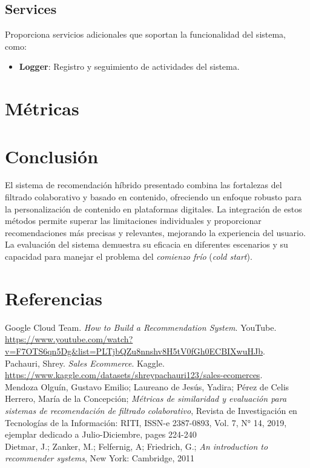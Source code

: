 \documentclass{llncs}
\begin{document}
\subsection{Services}
Proporciona servicios adicionales que soportan la funcionalidad del sistema, como:

\begin{itemize}
    \item \textbf{Logger}: Registro y seguimiento de actividades del sistema.
\end{itemize}

\section{Métricas}

\section{Conclusión}
El sistema de recomendación híbrido presentado combina las fortalezas del filtrado colaborativo y basado en contenido, ofreciendo un enfoque robusto para la personalización de contenido en plataformas digitales. La integración de estos métodos permite superar las limitaciones individuales y proporcionar recomendaciones más precisas y relevantes, mejorando la experiencia del usuario. La evaluación del sistema demuestra su eficacia en diferentes escenarios y su capacidad para manejar el problema del \textit{comienzo frío} (\textit{cold start}).

\section{Referencias}
\begin{thebibliography}{99}
Google Cloud Team. \textit{How to Build a Recommendation System}. YouTube. \url{https://www.youtube.com/watch?v=F7OTS6qn5Dg&list=PLTjbQZu8nnshv8H5tV0fGh0ECBIXwuHJb}.\\

Pachauri, Shrey. \textit{Sales Ecommerce}. Kaggle. \url{https://www.kaggle.com/datasets/shreypachauri123/sales-ecomerces}.\\

Mendoza Olguín, Gustavo Emilio; Laureano de Jesús, Yadira; Pérez de Celis Herrero, María de la Concepción; \textit{Métricas de similaridad y evaluación para sistemas de recomendación de filtrado colaborativo}, Revista de Investigación en Tecnologías de la Información: RITI, ISSN-e 2387-0893, Vol. 7, N° 14, 2019, ejemplar dedicado a Julio-Diciembre, pages 224-240\\

Dietmar, J.; Zanker, M.; Felfernig, A; Friedrich, G.; \textit{An introduction to recommender systems}, New York: Cambridge, 2011\\

\end{thebibliography}
\end{document}
